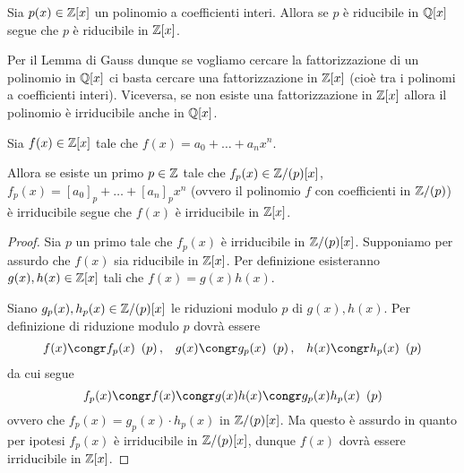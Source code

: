 \begin{theorem}
     \label{lemma_di_Gauss}
    Sia $p(x) \in \mathbb{Z}[x]$ un polinomio a coefficienti interi. Allora se $p$ è riducibile in $\mathbb{Q}[x]$ segue che $p$ è riducibile in $\mathbb{Z}[x]$.
\end{theorem}

Per il Lemma di Gauss dunque se vogliamo cercare la fattorizzazione di un polinomio in $\mathbb{Q}[x]$ ci basta cercare una fattorizzazione in $\mathbb{Z}[x]$ (cioè tra i polinomi a coefficienti interi). Viceversa, se non esiste una fattorizzazione in $\mathbb{Z}[x]$ allora il polinomio è irriducibile anche in $\mathbb{Q}[x]$.
\begin{proposition}
     \label{criterio_riduzione}
    Sia $f(x) \in \mathbb{Z}[x]$ tale che $f(x) = a_0 + \dots + a_nx^n$. 
    
    Allora se esiste un primo $p \in \mathbb{Z}$ tale che $f_p(x) \in \mathbb{Z}/(p)[x]$, $f_p(x) = [a_0]_p + \dots + [a_n]_px^n $ (ovvero il polinomio $f$ con coefficienti in $\mathbb{Z}/(p)$) è irriducibile segue che $f(x)$ è irriducibile in $\mathbb{Z}[x]$.
\end{proposition}
\begin{proof}
    Sia $p$ un primo tale che $f_p(x)$ è irriducibile in $\mathbb{Z}/(p)[x]$. Supponiamo per assurdo che $f(x)$ sia riducibile in $\mathbb{Z}[x]$. Per definizione esisteranno $g(x), h(x) \in \mathbb{Z}[x]$ tali che $f(x) = g(x)h(x)$.

    Siano $g_p(x), h_p(x) \in \mathbb{Z}/(p)[x]$ le riduzioni modulo $p$ di $g(x), h(x)$. Per definizione di riduzione modulo $p$ dovrà essere \begin{align*}
        f(x) \congr f_p(x) \Mod{p}, &&g(x) \congr g_p(x) \Mod{p}, &&h(x) \congr h_p(x) \Mod{p}
    \end{align*} da cui segue \[
        f_p(x) \congr f(x) \congr g(x)h(x) \congr g_p(x)h_p(x) \Mod{p}    
    \] ovvero che $f_p(x) = g_p(x) \cdot h_p(x)$ in $\mathbb{Z}/(p)[x]$. Ma questo è assurdo in quanto per ipotesi $f_p(x)$ è irriducibile in $\mathbb{Z}/(p)[x]$, dunque $f(x)$ dovrà essere irriducibile in $\mathbb{Z}[x]$.
\end{proof}

